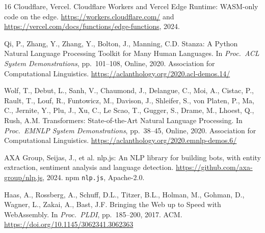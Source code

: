 \documentclass[smallextended]{svjour3}
\begin{document}
\begin{thebibliography}{16}
Cloudflare, Vercel.
Cloudflare Workers and Vercel Edge Runtime: WASM-only code on the edge.
\url{https://workers.cloudflare.com/} and \url{https://vercel.com/docs/functions/edge-functions}, 2024.

Qi, P., Zhang, Y., Zhang, Y., Bolton, J., Manning, C.D.
Stanza: A Python Natural Language Processing Toolkit for Many Human Languages.
In \textit{Proc.\ ACL System Demonstrations}, pp.\ 101--108, Online, 2020. Association for Computational Linguistics.
\url{https://aclanthology.org/2020.acl-demos.14/}

Wolf, T., Debut, L., Sanh, V., Chaumond, J., Delangue, C., Moi, A., Cistac, P., Rault, T., Louf, R., Funtowicz, M., Davison, J., Shleifer, S., von Platen, P., Ma, C., Jernite, Y., Plu, J., Xu, C., Le Scao, T., Gugger, S., Drame, M., Lhoest, Q., Rush, A.M.
Transformers: State-of-the-Art Natural Language Processing.
In \textit{Proc.\ EMNLP System Demonstrations}, pp.\ 38--45, Online, 2020. Association for Computational Linguistics.
\url{https://aclanthology.org/2020.emnlp-demos.6/}

AXA Group, Seijas, J., et al.
nlp.js: An NLP library for building bots, with entity extraction, sentiment analysis and language detection.
\url{https://github.com/axa-group/nlp.js}, 2024. npm \texttt{nlp.js}, Apache-2.0.

Haas, A., Rossberg, A., Schuff, D.L., Titzer, B.L., Holman, M., Gohman, D., Wagner, L., Zakai, A., Bast, J.F.
Bringing the Web up to Speed with WebAssembly.
In \textit{Proc.\ PLDI}, pp.\ 185--200, 2017. ACM.
\url{https://doi.org/10.1145/3062341.3062363}

\end{thebibliography}
\end{document}
